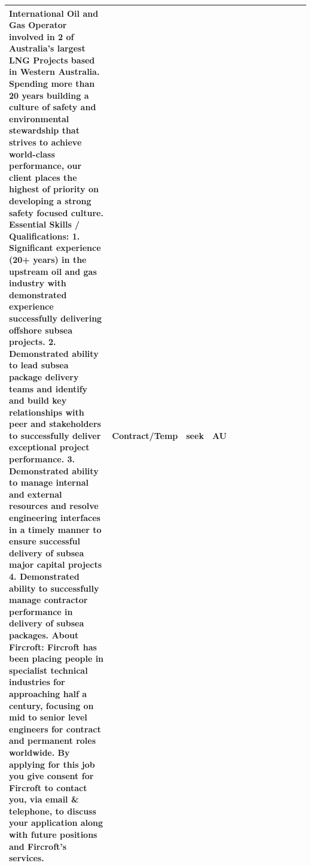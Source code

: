 \documentclass[11pt,a4paper,]{article}
\begin{document}
\begin{table}
\begin{tabular}[t]{l|l|l|l|l|l|l|l|l|l|l|l|l}
International Oil and Gas Operator involved in 2 of Australia's largest LNG Projects based in Western Australia. Spending more than 20 years building a culture of safety and environmental stewardship that strives to achieve world-class performance, our client places the highest of priority on developing a strong safety focused culture. Essential Skills / Qualifications: 1. Significant experience (20+ years) in the upstream oil and gas industry with demonstrated experience successfully delivering offshore subsea projects. 2. Demonstrated ability to lead subsea package delivery teams and identify and build key relationships with peer and stakeholders to successfully deliver exceptional project performance. 3. Demonstrated ability to manage internal and external resources and resolve engineering interfaces in a timely manner to ensure successful delivery of subsea major capital projects 4. Demonstrated ability to successfully manage contractor performance in delivery of subsea packages. About Fircroft: Fircroft has been placing people in specialist technical industries for approaching half a century, focusing on mid to senior level engineers for contract and permanent roles worldwide. By applying for this job you give consent for Fircroft to contact you, via email \& telephone, to discuss your application along with future positions and Fircroft’s services. & Contract/Temp & seek & AU &  & \\
\hline

\end{tabular}
\end{table}
\end{document}
